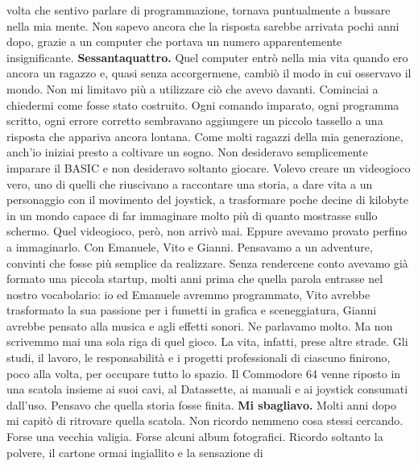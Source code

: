 \documentclass{article}
\begin{document}
volta che sentivo parlare di programmazione, tornava puntualmente a bussare nella mia mente.\newline
Non sapevo ancora che la risposta sarebbe arrivata pochi anni dopo, grazie a un computer che portava un numero
apparentemente insignificante.\newline
\textbf{Sessantaquattro.}\newline
Quel computer entrò nella mia vita quando ero ancora un ragazzo e, quasi senza accorgermene, cambiò il modo in cui
osservavo il mondo. Non mi limitavo più a utilizzare ciò che avevo davanti. Cominciai a chiedermi come fosse stato
costruito. Ogni comando imparato, ogni programma scritto, ogni errore corretto sembravano aggiungere un piccolo
tassello a una risposta che appariva ancora lontana.\newline
Come molti ragazzi della mia generazione, anch'io iniziai presto a coltivare un sogno. Non desideravo semplicemente
imparare il BASIC e non desideravo soltanto giocare. Volevo creare un videogioco vero, uno di quelli che riuscivano a
raccontare una storia, a dare vita a un personaggio con il movimento del joystick, a trasformare poche decine di
kilobyte in un mondo capace di far immaginare molto più di quanto mostrasse sullo schermo.\newline
Quel videogioco, però, non arrivò mai. Eppure avevamo provato perfino a immaginarlo. Con Emanuele, Vito e Gianni.
Pensavamo a un adventure, convinti che fosse più semplice da realizzare. Senza rendercene conto avevamo già formato una
piccola startup, molti anni prima che quella parola entrasse nel nostro vocabolario: io ed Emanuele avremmo
programmato, Vito avrebbe trasformato la sua passione per i fumetti in grafica e sceneggiatura, Gianni avrebbe pensato
alla musica e agli effetti sonori. Ne parlavamo molto. Ma non scrivemmo mai una sola riga di quel gioco.\newline
La vita, infatti, prese altre strade. Gli studi, il lavoro, le responsabilità e i progetti professionali di ciascuno
finirono, poco alla volta, per occupare tutto lo spazio. Il Commodore 64 venne riposto in una scatola insieme ai suoi
cavi, al Datassette, ai manuali e ai joystick consumati dall'uso.\newline
Pensavo che quella storia fosse finita.\newline
\textbf{Mi sbagliavo.}\newline
Molti anni dopo mi capitò di ritrovare quella scatola. Non ricordo nemmeno cosa stessi cercando. Forse una vecchia
valigia. Forse alcuni album fotografici. Ricordo soltanto la polvere, il cartone ormai ingiallito e la sensazione di
\end{document}
